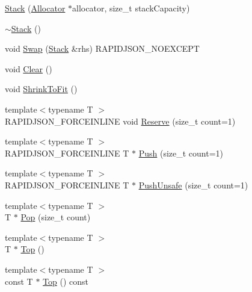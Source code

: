 \begin{DoxyCompactItemize}
\item 
\mbox{\hyperlink{classrapidjson_1_1internal_1_1_stack_ab8a8b942c223aea654baa07334938019}{Stack}} (\mbox{\hyperlink{classrapidjson_1_1_allocator}{Allocator}} $\ast$allocator, size\+\_\+t stack\+Capacity)
\item 
\mbox{\hyperlink{classrapidjson_1_1internal_1_1_stack_a1d8ebafffb9d65ebd966e06c55ed69e3}{$\sim$\+Stack}} ()
\item 
void \mbox{\hyperlink{classrapidjson_1_1internal_1_1_stack_ae45ca5eb4e96402169dcd0bd1bd011bf}{Swap}} (\mbox{\hyperlink{classrapidjson_1_1internal_1_1_stack}{Stack}} \&rhs) R\+A\+P\+I\+D\+J\+S\+O\+N\+\_\+\+N\+O\+E\+X\+C\+E\+PT
\item 
void \mbox{\hyperlink{classrapidjson_1_1internal_1_1_stack_a3ca75baf72a1d4e33024fad61e722063}{Clear}} ()
\item 
void \mbox{\hyperlink{classrapidjson_1_1internal_1_1_stack_ac0f6b58689374b5ac55337720676ac4e}{Shrink\+To\+Fit}} ()
\item 
{\footnotesize template$<$typename T $>$ }\\R\+A\+P\+I\+D\+J\+S\+O\+N\+\_\+\+F\+O\+R\+C\+E\+I\+N\+L\+I\+NE void \mbox{\hyperlink{classrapidjson_1_1internal_1_1_stack_a67e2306eddcdbf50271e89b229573fc2}{Reserve}} (size\+\_\+t count=1)
\item 
{\footnotesize template$<$typename T $>$ }\\R\+A\+P\+I\+D\+J\+S\+O\+N\+\_\+\+F\+O\+R\+C\+E\+I\+N\+L\+I\+NE T $\ast$ \mbox{\hyperlink{classrapidjson_1_1internal_1_1_stack_aaa78ff2b719edef3bbccf0454263636c}{Push}} (size\+\_\+t count=1)
\item 
{\footnotesize template$<$typename T $>$ }\\R\+A\+P\+I\+D\+J\+S\+O\+N\+\_\+\+F\+O\+R\+C\+E\+I\+N\+L\+I\+NE T $\ast$ \mbox{\hyperlink{classrapidjson_1_1internal_1_1_stack_aeec5f2a60d38743c95ea45bc75ad5c7a}{Push\+Unsafe}} (size\+\_\+t count=1)
\item 
{\footnotesize template$<$typename T $>$ }\\T $\ast$ \mbox{\hyperlink{classrapidjson_1_1internal_1_1_stack_a58f510acbf1548de4127233905b82449}{Pop}} (size\+\_\+t count)
\item 
{\footnotesize template$<$typename T $>$ }\\T $\ast$ \mbox{\hyperlink{classrapidjson_1_1internal_1_1_stack_ac77714adcc6dd02bf119d206232657b4}{Top}} ()
\item 
{\footnotesize template$<$typename T $>$ }\\const T $\ast$ \mbox{\hyperlink{classrapidjson_1_1internal_1_1_stack_aeb9393dba448f7c424a0aba46ea13768}{Top}} () const

\end{DoxyCompactItemize}
